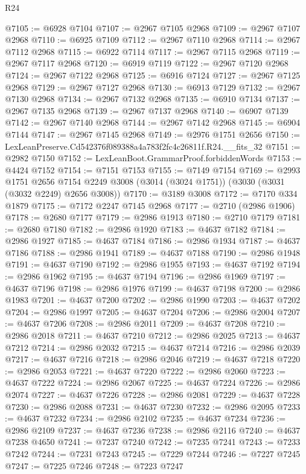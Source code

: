 \begin{lexlean}{R24}
\begin{coremodule}
@7105 := @6928 @7104
@7107 := @2967 @7105 @2968
@7109 := @2967 @7107 @2968
@7110 := @6925 @7109
@7112 := @2967 @7110 @2968
@7114 := @2967 @7112 @2968
@7115 := @6922 @7114
@7117 := @2967 @7115 @2968
@7119 := @2967 @7117 @2968
@7120 := @6919 @7119
@7122 := @2967 @7120 @2968
@7124 := @2967 @7122 @2968
@7125 := @6916 @7124
@7127 := @2967 @7125 @2968
@7129 := @2967 @7127 @2968
@7130 := @6913 @7129
@7132 := @2967 @7130 @2968
@7134 := @2967 @7132 @2968
@7135 := @6910 @7134
@7137 := @2967 @7135 @2968
@7139 := @2967 @7137 @2968
@7140 := @6907 @7139
@7142 := @2967 @7140 @2968
@7144 := @2967 @7142 @2968
@7145 := @6904 @7144
@7147 := @2967 @7145 @2968
@7149 := @2976 @1751 @2656
@7150 := LexLeanPreserve.Cd542376f089388a4a783f2fc4c26811f.R24.__fits_32
@7151 := @2982 @7150
@7152 := LexLeanBoot.GrammarProof.forbiddenWords
@7153 := @4424 @7152
@7154 := @7151 @7153
@7155 := @7149 @7154
@7169 := @2993
    @1751
    @2656
    @7154
    @2249
    @3008
    (@3014 (@3024 @1751))
    (@3030 (@3031 (@3032 @2249) @2656 @3008))
@7170 := @3189 @3008
@7172 := @7170 @334 @1879
@7175 := @7172 @2247 @7145 @2968
@7177 := @2710 (@2986 @1906)
@7178 := @2680 @7177
@7179 := @2986 @1913
@7180 := @2710 @7179
@7181 := @2680 @7180
@7182 := @2986 @1920
@7183 := @4637 @7182
@7184 := @2986 @1927
@7185 := @4637 @7184
@7186 := @2986 @1934
@7187 := @4637 @7186
@7188 := @2986 @1941
@7189 := @4637 @7188
@7190 := @2986 @1948
@7191 := @4637 @7190
@7192 := @2986 @1955
@7193 := @4637 @7192
@7194 := @2986 @1962
@7195 := @4637 @7194
@7196 := @2986 @1969
@7197 := @4637 @7196
@7198 := @2986 @1976
@7199 := @4637 @7198
@7200 := @2986 @1983
@7201 := @4637 @7200
@7202 := @2986 @1990
@7203 := @4637 @7202
@7204 := @2986 @1997
@7205 := @4637 @7204
@7206 := @2986 @2004
@7207 := @4637 @7206
@7208 := @2986 @2011
@7209 := @4637 @7208
@7210 := @2986 @2018
@7211 := @4637 @7210
@7212 := @2986 @2025
@7213 := @4637 @7212
@7214 := @2986 @2032
@7215 := @4637 @7214
@7216 := @2986 @2039
@7217 := @4637 @7216
@7218 := @2986 @2046
@7219 := @4637 @7218
@7220 := @2986 @2053
@7221 := @4637 @7220
@7222 := @2986 @2060
@7223 := @4637 @7222
@7224 := @2986 @2067
@7225 := @4637 @7224
@7226 := @2986 @2074
@7227 := @4637 @7226
@7228 := @2986 @2081
@7229 := @4637 @7228
@7230 := @2986 @2088
@7231 := @4637 @7230
@7232 := @2986 @2095
@7233 := @4637 @7232
@7234 := @2986 @2102
@7235 := @4637 @7234
@7236 := @2986 @2109
@7237 := @4637 @7236
@7238 := @2986 @2116
@7240 := @4637 @7238 @4650
@7241 := @7237 @7240
@7242 := @7235 @7241
@7243 := @7233 @7242
@7244 := @7231 @7243
@7245 := @7229 @7244
@7246 := @7227 @7245
@7247 := @7225 @7246
@7248 := @7223 @7247

\end{coremodule}
\end{lexlean}
